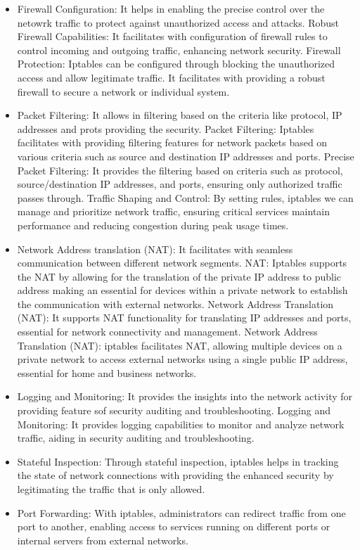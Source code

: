 \begin{itemize}
    \item Firewall Configuration: It helps in enabling the precise control over the netowrk traffic to protect against unauthorized access and attacks.
    Robust Firewall Capabilities: It facilitates with configuration of firewall rules to control incoming and outgoing traffic, enhancing network security.
    Firewall Protection: Iptables can be configured through blocking the unauthorized access and allow legitimate traffic. It facilitates with providing a robust firewall to secure a network or individual system.
    \item Packet Filtering: It allows in filtering based on the criteria like protocol, IP addresses and prots providing the security.
    Packet Filtering: Iptables facilitates with providing filtering features for network packets based on various criteria such as source and destination IP addresses and ports.
    Precise Packet Filtering: It provides the filtering based on criteria such as protocol, source/destination IP addresses, and ports, ensuring only authorized traffic passes through.
    Traffic Shaping and Control: By setting rules, iptables we can manage and prioritize network traffic, ensuring critical services maintain performance and reducing congestion during peak usage times.
    \item Network Address translation (NAT): It facilitates with seamless communication between different network segments.
    NAT: Iptables supports the NAT by allowing for the translation of the private IP address to public address making an essential for devices within a private network to establish the communication with external networks.
    Network Address Translation (NAT): It supports NAT functionality for translating IP addresses and ports, essential for network connectivity and management.
    Network Address Translation (NAT): iptables facilitates NAT, allowing multiple devices on a private network to access external networks using a single public IP address, essential for home and business networks.
    \item Logging and Monitoring: It provides the insights into the network activity for providing feature sof security auditing and troubleshooting. 
    Logging and Monitoring: It provides logging capabilities to monitor and analyze network traffic, aiding in security auditing and troubleshooting.
    \item Stateful Inspection: Through stateful inspection, iptables helps in tracking the state of network connections with providing the enhanced security by legitimating the traffic that is only allowed.
    \item Port Forwarding: With iptables, administrators can redirect traffic from one port to another, enabling access to services running on different ports or internal servers from external networks.
\end{itemize} 


